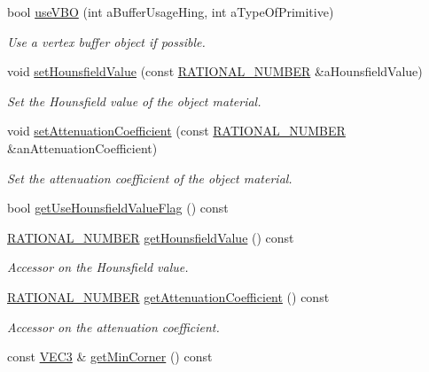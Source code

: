 \begin{DoxyCompactItemize}
bool \hyperlink{class_graphics_1_1_polygon_mesh_a790ef6e4861d98228830170f0217661b}{useVBO} (int aBufferUsageHing, int aTypeOfPrimitive)
\begin{DoxyCompactList}\small\item\em Use a vertex buffer object if possible. \end{DoxyCompactList}\item 
void \hyperlink{class_graphics_1_1_polygon_mesh_a2fb399af8869e1989e25c3eadb101c02}{setHounsfieldValue} (const \hyperlink{namespace_utilities_a40969b96bd8d847b962e297cb79f08ce}{RATIONAL\_\-NUMBER} \&aHounsfieldValue)
\begin{DoxyCompactList}\small\item\em Set the Hounsfield value of the object material. \end{DoxyCompactList}\item 
void \hyperlink{class_graphics_1_1_polygon_mesh_ad32af6aa79c5822729ac48cced78e477}{setAttenuationCoefficient} (const \hyperlink{namespace_utilities_a40969b96bd8d847b962e297cb79f08ce}{RATIONAL\_\-NUMBER} \&anAttenuationCoefficient)
\begin{DoxyCompactList}\small\item\em Set the attenuation coefficient of the object material. \end{DoxyCompactList}\item 
bool \hyperlink{class_graphics_1_1_polygon_mesh_ad04b48ad09e20ecbfbf9d5c97331ef90}{getUseHounsfieldValueFlag} () const 
\item 
\hyperlink{namespace_utilities_a40969b96bd8d847b962e297cb79f08ce}{RATIONAL\_\-NUMBER} \hyperlink{class_graphics_1_1_polygon_mesh_a81fdfafcb621af66d7d9333ba5684491}{getHounsfieldValue} () const 
\begin{DoxyCompactList}\small\item\em Accessor on the Hounsfield value. \end{DoxyCompactList}\item 
\hyperlink{namespace_utilities_a40969b96bd8d847b962e297cb79f08ce}{RATIONAL\_\-NUMBER} \hyperlink{class_graphics_1_1_polygon_mesh_a5d19970ad39b804d00be1eff20c31365}{getAttenuationCoefficient} () const 
\begin{DoxyCompactList}\small\item\em Accessor on the attenuation coefficient. \end{DoxyCompactList}\item 
const \hyperlink{class_math_1_1_vec3}{VEC3} \& \hyperlink{class_graphics_1_1_polygon_mesh_a573df0163340b2e7b8dcdd2b1caea790}{getMinCorner} () const 

\end{DoxyCompactItemize}
